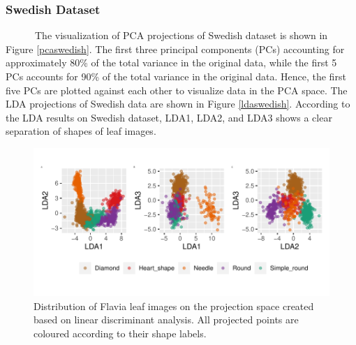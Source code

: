 \documentclass{article}
\begin{document}
\hypertarget{swedish-dataset}{%
\subsubsection{Swedish Dataset}\label{swedish-dataset}}

~~~~~~The visualization of PCA projections of Swedish dataset is shown
in Figure \ref{pcaswedish}. The first three principal components (PCs)
accounting for approximately 80\% of the total variance in the original
data, while the first 5 PCs accounts for 90\% of the total variance in
the original data. Hence, the first five PCs are plotted against each
other to visualize data in the PCA space. The LDA projections of Swedish
data are shown in Figure \ref{ldaswedish}. According to the LDA results
on Swedish dataset, LDA1, LDA2, and LDA3 shows a clear separation of
shapes of leaf images.

\begin{figure}
\centering
\includegraphics{img/ldaflavia-1.pdf}
\caption{\label{ldaflavia}Distribution of Flavia leaf images on the
projection space created based on linear discriminant analysis. All
projected points are coloured according to their shape labels.}
\end{figure}
\end{document}
